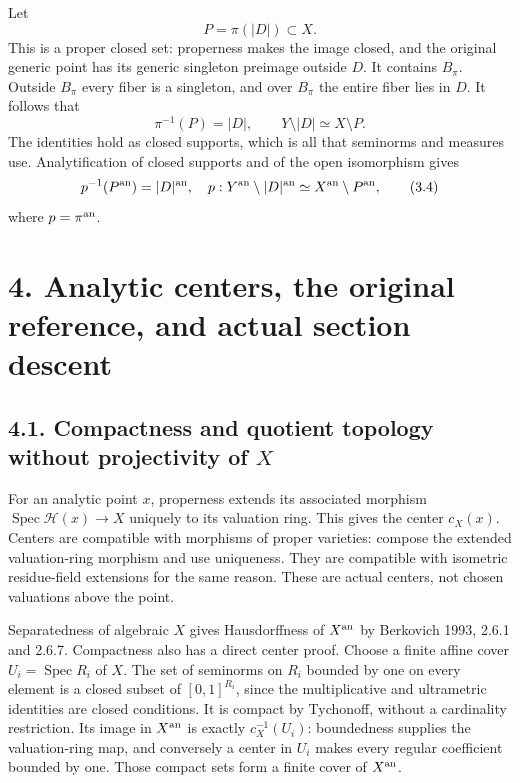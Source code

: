 \documentclass[
  10pt,
]{article}
\begin{document}
Let \[P=\pi(|D|)\subset X.\] This is a proper closed set: properness
makes the image closed, and the original generic point has its generic
singleton preimage outside \(D\). It contains \(B_\pi\). Outside
\(B_\pi\) every fiber is a singleton, and over \(B_\pi\) the entire
fiber lies in \(D\). It follows that \[\pi^{-1}(P)=|D|,
\qquad Y\setminus|D|\simeq X\setminus P.                 \tag{3.3}\] The
identities hold as closed supports, which is all that seminorms and
measures use. Analytification of closed supports and of the open
isomorphism gives \[p^{-1}(P^{\rm an})=|D|^{\rm an},\quad
p:Y^{\rm an}\setminus|D|^{\rm an}\simeq X^{\rm an}\setminus P^{\rm an}, \tag{3.4}\]
where \(p=\pi^{\rm an}\).

\section{4. Analytic centers, the original reference, and actual section
descent}\label{analytic-centers-the-original-reference-and-actual-section-descent}

\subsection{\texorpdfstring{4.1. Compactness and quotient topology
without projectivity of
\(X\)}{4.1. Compactness and quotient topology without projectivity of X}}\label{compactness-and-quotient-topology-without-projectivity-of-x}

For an analytic point \(x\), properness extends its associated morphism
\(\operatorname{Spec}\mathcal H(x)\to X\) uniquely to its valuation
ring. This gives the center \(c_X(x)\). Centers are compatible with
morphisms of proper varieties: compose the extended valuation-ring
morphism and use uniqueness. They are compatible with isometric
residue-field extensions for the same reason. These are actual centers,
not chosen valuations above the point.

Separatedness of algebraic \(X\) gives Hausdorffness of \(X^{\rm an}\)
by Berkovich 1993, 2.6.1 and 2.6.7. Compactness also has a direct center
proof. Choose a finite affine cover \(U_i=\operatorname{Spec}R_i\) of
\(X\). The set of seminorms on \(R_i\) bounded by one on every element
is a closed subset of \([0,1]^{R_i}\), since the multiplicative and
ultrametric identities are closed conditions. It is compact by
Tychonoff, without a cardinality restriction. Its image in
\(X^{\rm an}\) is exactly \(c_X^{-1}(U_i)\): boundedness supplies the
valuation-ring map, and conversely a center in \(U_i\) makes every
regular coefficient bounded by one. Those compact sets form a finite
cover of \(X^{\rm an}\).
\end{document}
